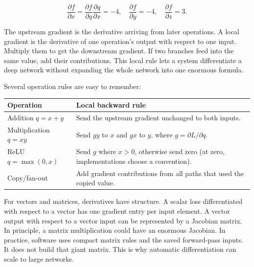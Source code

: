 \[\frac{\partial f}{\partial x}=\frac{\partial f}{\partial q}\frac{\partial q}{\partial x}=-4, \quad \frac{\partial f}{\partial y}=-4, \quad \frac{\partial f}{\partial z}=3.\]

The upstream gradient is the derivative arriving from later operations. A local gradient is the derivative of one operation's output with respect to one input. Multiply them to get the downstream gradient. If two branches feed into the same value, add their contributions. This local rule lets a system differentiate a deep network without expanding the whole network into one enormous formula.

Several operation rules are easy to remember:

{\def\LTcaptype{none} %
\begin{longtable}[]{@{}
  >{\raggedright\arraybackslash}p{}
  >{\raggedright\arraybackslash}p{}@{}}
\toprule\noalign{}
\begin{minipage}[b]{\linewidth}\raggedright
Operation
\end{minipage} & \begin{minipage}[b]{\linewidth}\raggedright
Local backward rule
\end{minipage} \\
\midrule\noalign{}
\endhead
\bottomrule\noalign{}
\endlastfoot
Addition \(q=x+y\) & Send the upstream gradient unchanged to both inputs. \\
Multiplication \(q=xy\) & Send \(g y\) to \(x\) and \(g x\) to \(y\), where \(g=\partial L/\partial q\). \\
ReLU \(q=\max(0,x)\) & Send \(g\) where \(x>0\), otherwise send zero (at zero, implementations choose a convention). \\
Copy/fan-out & Add gradient contributions from all paths that used the copied value. \\
\end{longtable}
}

For vectors and matrices, derivatives have structure. A scalar loss differentiated with respect to a vector has one gradient entry per input element. A vector output with respect to a vector input can be represented by a Jacobian matrix. In principle, a matrix multiplication could have an enormous Jacobian. In practice, software uses compact matrix rules and the saved forward-pass inputs. It does not build that giant matrix. This is why automatic differentiation can scale to large networks.

